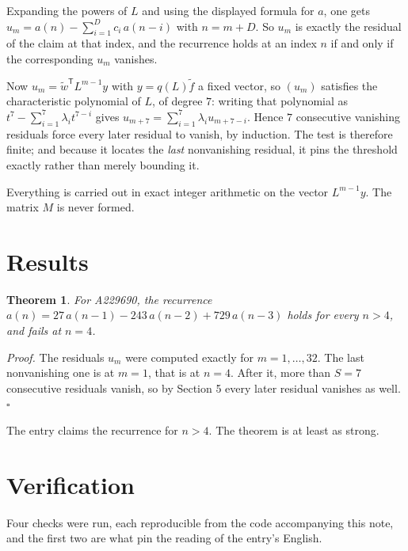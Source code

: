 \documentclass[11pt]{article}
\newtheorem{theorem}{Theorem}
\theoremstyle{definition}
\begin{document}
Expanding the powers of $L$ and using the displayed formula for $a$, one gets $u_m = a(n) - \sum_{i=1}^{D} c_i\,a(n-i)$ with $n = m + D$. So $u_m$ is exactly the residual of the claim at that index, and the recurrence holds at an index $n$ if and only if the corresponding $u_m$ vanishes.

Now $u_m = \tilde w^{\mathsf T} L^{m-1} y$ with $y = q(L)\tilde f$ a fixed vector, so $(u_m)$ satisfies the characteristic polynomial of $L$, of degree $7$: writing that polynomial as $t^{7} - \sum_{i=1}^{7} \lambda_i t^{7-i}$ gives $u_{m+7} = \sum_{i=1}^{7} \lambda_i u_{m+7-i}$. Hence $7$ consecutive vanishing residuals force every later residual to vanish, by induction. The test is therefore finite; and because it locates the {\itshape last} nonvanishing residual, it pins the threshold exactly rather than merely bounding it.

Everything is carried out in exact integer arithmetic on the vector $L^{m-1}y$. The matrix $M$ is never formed.

\section{Results}

\begin{theorem} For A229690, the recurrence $a(n) = 27\,a(n-1) - 243\,a(n-2) + 729\,a(n-3)$ holds for every $n > 4$, and fails at $n = 4$.\end{theorem}

{\itshape Proof.} The residuals $u_m$ were computed exactly for $m = 1,\dots,32$. The last nonvanishing one is at $m = 1$, that is at $n = 4$. After it, more than $S = 7$ consecutive residuals vanish, so by Section 5 every later residual vanishes as well. $\square$

The entry claims the recurrence for $n > 4$. The theorem is at least as strong.

\section{Verification}

Four checks were run, each reproducible from the code accompanying this note, and the first two are what pin the reading of the entry's English.
\end{document}
